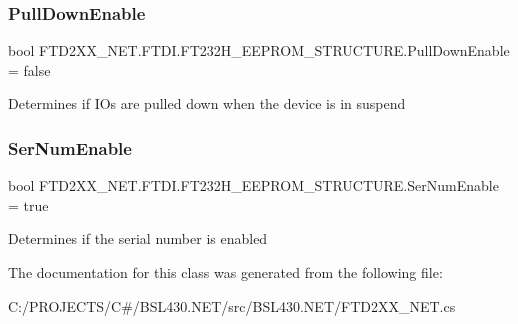 \subsubsection{\texorpdfstring{PullDownEnable}{PullDownEnable}}
{\footnotesize\ttfamily bool F\+T\+D2\+X\+X\+\_\+\+N\+E\+T.\+F\+T\+D\+I.\+F\+T232\+H\+\_\+\+E\+E\+P\+R\+O\+M\+\_\+\+S\+T\+R\+U\+C\+T\+U\+R\+E.\+Pull\+Down\+Enable = false}



Determines if I\+Os are pulled down when the device is in suspend 

\mbox{\label{class_f_t_d2_x_x___n_e_t_1_1_f_t_d_i_1_1_f_t232_h___e_e_p_r_o_m___s_t_r_u_c_t_u_r_e_a2652a27a352b7b839893523728b43307}} 
\subsubsection{\texorpdfstring{SerNumEnable}{SerNumEnable}}
{\footnotesize\ttfamily bool F\+T\+D2\+X\+X\+\_\+\+N\+E\+T.\+F\+T\+D\+I.\+F\+T232\+H\+\_\+\+E\+E\+P\+R\+O\+M\+\_\+\+S\+T\+R\+U\+C\+T\+U\+R\+E.\+Ser\+Num\+Enable = true}



Determines if the serial number is enabled 



The documentation for this class was generated from the following file\+:\begin{DoxyCompactItemize}
\item 
C\+:/\+P\+R\+O\+J\+E\+C\+T\+S/\+C\#/\+B\+S\+L430.\+N\+E\+T/src/\+B\+S\+L430.\+N\+E\+T/F\+T\+D2\+X\+X\+\_\+\+N\+E\+T.\+cs\end{DoxyCompactItemize}
